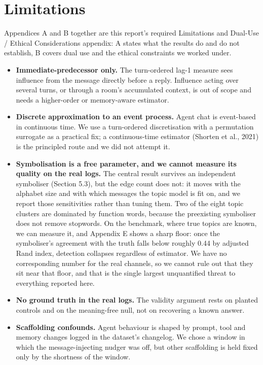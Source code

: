 \documentclass[11pt]{article}
\renewcommand{\thesection}{\arabic{section}.}
\begin{document}
\appendix
\renewcommand{\thesection}{Appendix \Alph{section}:}

\section{Limitations}

Appendices A and B together are this report's required Limitations and Dual-Use / Ethical Considerations appendix: A states what the results do and do not establish, B covers dual use and the ethical constraints we worked under.

\begin{itemize}
\item \textbf{Immediate-predecessor only.} The turn-ordered lag-1 measure sees influence from the message directly before a reply. Influence acting over several turns, or through a room's accumulated context, is out of scope and needs a higher-order or memory-aware estimator.
\item \textbf{Discrete approximation to an event process.} Agent chat is event-based in continuous time. We use a turn-ordered discretisation with a permutation surrogate as a practical fix; a continuous-time estimator (Shorten et al., 2021) is the principled route and we did not attempt it.
\item \textbf{Symbolisation is a free parameter, and we cannot measure its quality on the real logs.} The central result survives an independent symboliser (Section 5.3), but the edge count does not: it moves with the alphabet size and with which messages the topic model is fit on, and we report those sensitivities rather than tuning them. Two of the eight topic clusters are dominated by function words, because the preexisting symboliser does not remove stopwords. On the benchmark, where true topics are known, we can measure it, and Appendix E shows a sharp floor: once the symboliser's agreement with the truth falls below roughly 0.44 by adjusted Rand index, detection collapses regardless of estimator. We have no corresponding number for the real channels, so we cannot rule out that they sit near that floor, and that is the single largest unquantified threat to everything reported here.
\item \textbf{No ground truth in the real logs.} The validity argument rests on planted controls and on the meaning-free null, not on recovering a known answer.
\item \textbf{Scaffolding confounds.} Agent behaviour is shaped by prompt, tool and memory changes logged in the dataset's changelog. We chose a window in which the message-injecting nudger was off, but other scaffolding is held fixed only by the shortness of the window.

\end{itemize}
\end{document}
